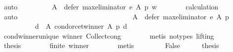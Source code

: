 \begin{isabellebody}
\ auto\isanewline
\ \ \ \ \isamarkupfalse%
\ \isamarkupfalse%
\ {\isachardoublequoteopen}{\isachardot}{\kern0pt}{\isachardot}{\kern0pt}{\isachardot}{\kern0pt}\ {\isacharequal}{\kern0pt}\ {\isacharparenleft}{\kern0pt}{\isacharbraceleft}{\kern0pt}{\isacharbraceright}{\kern0pt}{\isacharcomma}{\kern0pt}A\ {\isacharminus}{\kern0pt}\ defer\ {\isacharparenleft}{\kern0pt}max{\isacharunderscore}{\kern0pt}eliminator\ e{\isacharparenright}{\kern0pt}\ A\ p{\isacharcomma}{\kern0pt}\ {\isacharbraceleft}{\kern0pt}w{\isacharbraceright}{\kern0pt}{\isacharparenright}{\kern0pt}{\isachardoublequoteclose}\isanewline
\ \ \ \ \ \ \isamarkupfalse%
\ calculation\isanewline
\ \ \ \ \ \ \isamarkupfalse%
\ auto\isanewline
\ \ \ \ \isamarkupfalse%
\ \isamarkupfalse%
\isanewline
\ \ \ \ \ \ {\isachardoublequoteopen}{\isachardot}{\kern0pt}{\isachardot}{\kern0pt}{\isachardot}{\kern0pt}\ {\isacharequal}{\kern0pt}\isanewline
\ \ \ \ \ \ \ \ {\isacharparenleft}{\kern0pt}{\isacharbraceleft}{\kern0pt}{\isacharbraceright}{\kern0pt}{\isacharcomma}{\kern0pt}\isanewline
\ \ \ \ \ \ \ \ \ \ A\ {\isacharminus}{\kern0pt}\ defer\ {\isacharparenleft}{\kern0pt}max{\isacharunderscore}{\kern0pt}eliminator\ e{\isacharparenright}{\kern0pt}\ A\ p{\isacharcomma}{\kern0pt}\isanewline
\ \ \ \ \ \ \ \ \ \ {\isacharbraceleft}{\kern0pt}d\ {\isasymin}\ A{\isachardot}{\kern0pt}\ condorcet{\isacharunderscore}{\kern0pt}winner\ A\ p\ d{\isacharbraceright}{\kern0pt}{\isacharparenright}{\kern0pt}{\isachardoublequoteclose}\isanewline
\ \ \ \ \ \ \isamarkupfalse%
\ cond{\isacharunderscore}{\kern0pt}winner{\isacharunderscore}{\kern0pt}unique{}\ winner\ Collect{\isacharunderscore}{\kern0pt}cong\isanewline
\ \ \ \ \ \ \isamarkupfalse%
\ {\isacharparenleft}{\kern0pt}metis\ {\isacharparenleft}{\kern0pt}no{\isacharunderscore}{\kern0pt}types{\isacharcomma}{\kern0pt}\ lifting{\isacharparenright}{\kern0pt}{\isacharparenright}{\kern0pt}\isanewline
\ \ \ \ \isamarkupfalse%
\ \isamarkupfalse%
\ {\isacharquery}{\kern0pt}thesis\isanewline
\ \ \ \ \ \ \isamarkupfalse%
\ finite\ winner\isanewline
\ \ \ \ \ \ \isamarkupfalse%
\ metis\isanewline
\ \ \isamarkupfalse%
\isanewline
\ \ \ \ \isamarkupfalse%
\ False\isanewline
\ \ \ \ \isamarkupfalse%
\ {\isacharquery}{\kern0pt}thesis\isanewline
\ \ \ \ \isamarkupfalse%
\ {\isacharminus}{\kern0pt}\isanewline
\ \ \ \ \ \ \isamarkupfalse%

\end{isabellebody}

